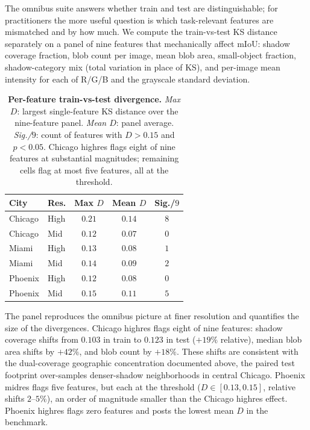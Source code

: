 The omnibus suite answers whether train and test are distinguishable; for practitioners the more useful question is which task-relevant features are mismatched and by how much. We compute the train-vs-test KS distance separately on a panel of nine features that mechanically affect mIoU: shadow coverage fraction, blob count per image, mean blob area, small-object fraction, shadow-category mix (total variation in place of KS), and per-image mean intensity for each of R/G/B and the grayscale standard deviation.

\begin{table}[h]
\centering
\small
\setlength{\tabcolsep}{6pt}
\caption{
\textbf{Per-feature train-vs-test divergence.}
\textit{Max $D$}: largest single-feature KS distance over the nine-feature panel.
\textit{Mean $D$}: panel average.
\textit{Sig./$9$}: count of features with $D > 0.15$ and $p < 0.05$.
Chicago highres flags eight of nine features at substantial magnitudes; remaining cells flag at most five features, all at the threshold.
}
\label{tab:splits-features}
\begin{tabular}{llccc}
\toprule
\textbf{City} & \textbf{Res.} & \textbf{Max $D$} & \textbf{Mean $D$} & \textbf{Sig./$9$} \\
\midrule
Chicago & High & $0.21$ & $0.14$ & $8$ \\
Chicago & Mid  & $0.12$ & $0.07$ & $0$ \\
Miami   & High & $0.13$ & $0.08$ & $1$ \\
Miami   & Mid  & $0.14$ & $0.09$ & $2$ \\
Phoenix & High & $0.12$ & $0.08$ & $0$ \\
Phoenix & Mid  & $0.15$ & $0.11$ & $5$ \\
\bottomrule
\end{tabular}
\end{table}

The panel reproduces the omnibus picture at finer resolution and quantifies the size of the divergences. Chicago highres flags eight of nine features: shadow coverage shifts from $0.103$ in train to $0.123$ in test ($+19\%$ relative), median blob area shifts by $+42\%$, and blob count by $+18\%$. These shifts are consistent with the dual-coverage geographic concentration documented above, the paired test footprint over-samples denser-shadow neighborhoods in central Chicago. Phoenix midres flags five features, but each at the threshold ($D \in [0.13, 0.15]$, relative shifts $2$--$5\%$), an order of magnitude smaller than the Chicago highres effect. Phoenix highres flags zero features and posts the lowest mean $D$ in the benchmark.

